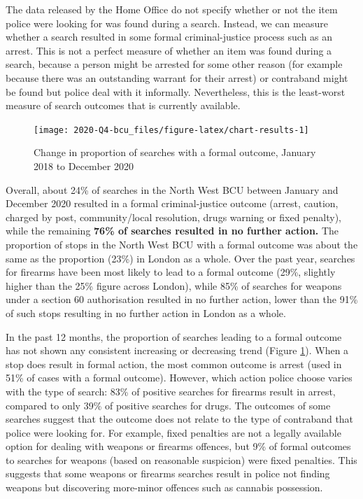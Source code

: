 \documentclass[
  a4paper,
  twoside, 11pt]{article}
\begin{document}
The data released by the Home Office do not specify whether or not the item police were looking for was found during a search. Instead, we can measure whether a search resulted in some formal criminal-justice process such as an arrest. This is not a perfect measure of whether an item was found during a search, because a person might be arrested for some other reason (for example because there was an outstanding warrant for their arrest) or contraband might be found but police deal with it informally. Nevertheless, this is the least-worst measure of search outcomes that is currently available.



\begin{figure}[h]

{\centering \texttt{[image: 2020-Q4-bcu\_files/figure-latex/chart-results-1]} 

}

\caption{Change in proportion of searches with a formal outcome, January 2018 to December 2020}\label{fig:chart-results}
\end{figure}

Overall, about 24\% of searches in the North West BCU between January and December 2020 resulted in a formal criminal-justice outcome (arrest, caution, charged by post, community/local resolution, drugs warning or fixed penalty), while the remaining \textbf{76\% of searches resulted in no further action.} The proportion of stops in the North West BCU with a formal outcome was about the same as the proportion (23\%) in London as a whole. Over the past year, searches for firearms have been most likely to lead to a formal outcome (29\%, slightly higher than the 25\% figure across London), while 85\% of searches for weapons under a section 60 authorisation resulted in no further action, lower than the 91\% of such stops resulting in no further action in London as a whole.

In the past 12 months, the proportion of searches leading to a formal outcome has not shown any consistent increasing or decreasing trend (Figure \ref{fig:chart-results}). When a stop does result in formal action, the most common outcome is arrest (used in 51\% of cases with a formal outcome). However, which action police choose varies with the type of search: 83\% of positive searches for firearms result in arrest, compared to only 39\% of positive searches for drugs. The outcomes of some searches suggest that the outcome does not relate to the type of contraband that police were looking for. For example, fixed penalties are not a legally available option for dealing with weapons or firearms offences, but 9\% of formal outcomes to searches for weapons (based on reasonable suspicion) were fixed penalties. This suggests that some weapons or firearms searches result in police not finding weapons but discovering more-minor offences such as cannabis possession.
\end{document}
